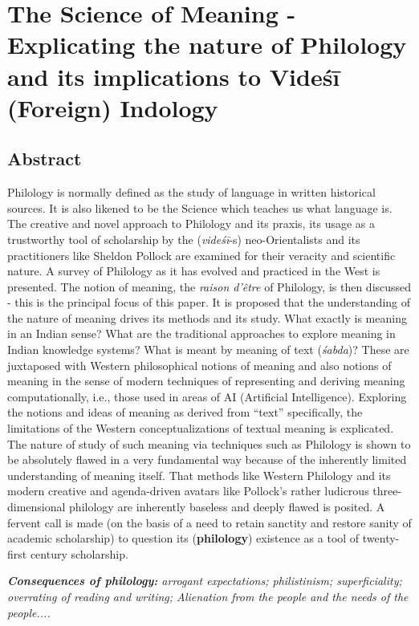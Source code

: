
\chapter{The Science of Meaning - Explicating the nature of Philology and its implications to Videśī (Foreign) Indology}



\section*{Abstract}

Philology is normally defined as the study of language in written historical sources. It is also likened to be the Science which teaches us what language is. The creative and novel approach to Philology and its praxis, its usage as a trustworthy tool of scholarship by the (\textit{videśī}-s) neo-Orientalists and its practitioners like Sheldon Pollock are examined for their veracity and scientific nature. A survey of Philology as it has evolved and practiced in the West is presented. The notion of meaning, the \textit{raison d’être} of Philology, is then discussed - this is the principal focus of this paper. It is proposed that the understanding of the nature of meaning drives its methods and its study. What exactly is meaning in an Indian sense? What are the traditional approaches to explore meaning in Indian knowledge systems? What is meant by meaning of text (\textit{śabda})? These are juxtaposed with Western philosophical notions of meaning and also notions of meaning in the sense of modern techniques of representing and deriving meaning computationally, i.e., those used in areas of AI (Artificial Intelligence). Exploring the notions and ideas of meaning as derived from “text” specifically, the limitations of the Western conceptualizations of textual meaning is explicated. The nature of study of such meaning via techniques such as Philology is shown to be absolutely flawed in a very fundamental way because of the inherently limited understanding of meaning itself. That methods like Western Philology and its modern creative and agenda-driven avatars like Pollock’s rather ludicrous three-dimensional philology are inherently baseless and deeply flawed is posited. A fervent call is made (on the basis of a need to retain sanctity and restore sanity of academic scholarship) to question its (\textbf{philology}) existence as a tool of twenty-first century scholarship.

\textit{\textbf{Consequences of philology:} arrogant expectations; philistinism; superficiality; overrating of reading and writing; Alienation from the people and the needs of the people.... }

